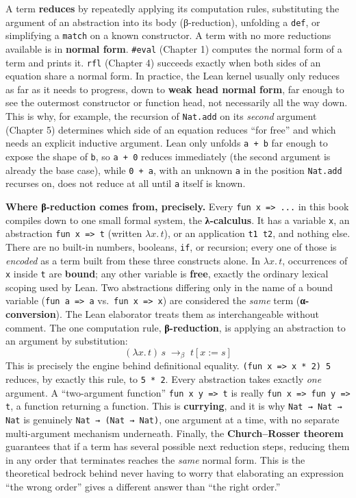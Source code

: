 A term \textbf{reduces} by repeatedly applying its computation rules, substituting the argument of an abstraction into its body (β-reduction), unfolding a \texttt{def}, or simplifying a \texttt{match} on a known constructor. A term with no more reductions available is in \textbf{normal form}. \texttt{\#eval} (Chapter 1) computes the normal form of a term and prints it. \texttt{rfl} (Chapter 4) succeeds exactly when both sides of an equation share a normal form. In practice, the Lean kernel usually only reduces as far as it needs to progress, down to \textbf{weak head normal form}, far enough to see the outermost constructor or function head, not necessarily all the way down. This is why, for example, the recursion of \texttt{Nat.add} on its \emph{second} argument (Chapter 5) determines which side of an equation reduces ``for free'' and which needs an explicit inductive argument. Lean only unfolds \texttt{a + b} far enough to expose the shape of \texttt{b}, so \texttt{a + 0} reduces immediately (the second argument is already the base case), while \texttt{0 + a}, with an unknown \texttt{a} in the position \texttt{Nat.add} recurses on, does not reduce at all until \texttt{a} itself is known.

\textbf{Where β-reduction comes from, precisely.} Every \texttt{fun x => ...} in this book compiles down to one small formal system, the \textbf{λ-calculus}. It has a variable \texttt{x}, an abstraction \texttt{fun x => t} (written \(\lambda x.\, t\)), or an application \texttt{t1 t2}, and nothing else. There are no built-in numbers, booleans, \texttt{if}, or recursion; every one of those is \emph{encoded} as a term built from these three constructs alone. In \(\lambda x.\, t\), occurrences of \texttt{x} inside \texttt{t} are \textbf{bound}; any other variable is \textbf{free}, exactly the ordinary lexical scoping used by Lean. Two abstractions differing only in the name of a bound variable (\texttt{fun a => a} vs.~\texttt{fun x => x}) are considered the \emph{same} term (\textbf{α-conversion}). The Lean elaborator treats them as interchangeable without comment. The one computation rule, \textbf{β-reduction}, is applying an abstraction to an argument by substitution: \[
(\lambda x.\, t)\, s \;\longrightarrow_\beta\; t[x := s]
\] This is precisely the engine behind definitional equality. \texttt{(fun x => x * 2) 5} reduces, by exactly this rule, to \texttt{5 * 2}. Every abstraction takes exactly \emph{one} argument. A ``two-argument function'' \texttt{fun x y => t} is really \texttt{fun x => fun y => t}, a function returning a function. This is \textbf{currying}, and it is why \texttt{Nat → Nat → Nat} is genuinely \texttt{Nat → (Nat → Nat)}, one argument at a time, with no separate multi-argument mechanism underneath. Finally, the \textbf{Church--Rosser theorem} guarantees that if a term has several possible next reduction steps, reducing them in any order that terminates reaches the \emph{same} normal form. This is the theoretical bedrock behind never having to worry that elaborating an expression ``the wrong order'' gives a different answer than ``the right order.''

